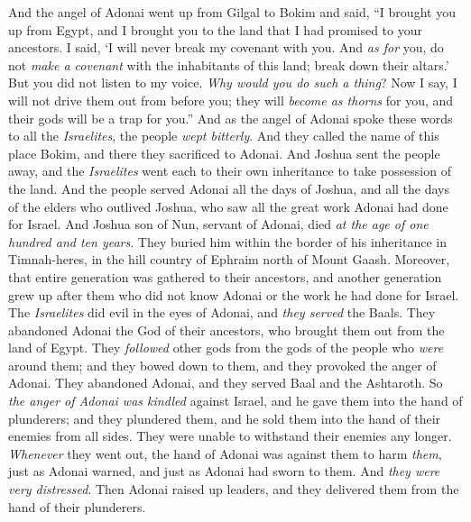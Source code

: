 \begin{biblechapter} %
 And the angel of Adonai went up from Gilgal to Bokim and said, “I brought you up from Egypt, and I brought you to the land that I had promised to your ancestors. I said, ‘I will never break my covenant with you.
\verse And \textit{as for} you, do not \textit{make a covenant} with the inhabitants of this land; break down their altars.’ But you did not listen to my voice. \textit{Why would you do such a thing}?
\verse Now I say, I will not drive them out from before you; they will \textit{become as thorns} for you, and their gods will be a trap for you.”
\verse And as the angel of Adonai spoke these words to all the \textit{Israelites}, the people \textit{wept bitterly}.
\verse And they called the name of this place Bokim, and there they sacrificed to Adonai.
 And Joshua sent the people away, and the \textit{Israelites} went each to their own inheritance to take possession of the land.
\verse And the people served Adonai all the days of Joshua, and all the days of the elders who outlived Joshua, who saw all the great work Adonai had done for Israel.
\verse And Joshua son of Nun, servant of Adonai, died \textit{at the age of one hundred and ten years}.
\verse They buried him within the border of his inheritance in Timnah-heres, in the hill country of Ephraim north of Mount Gaash.
\verse Moreover, that entire generation was gathered to their ancestors, and another generation grew up after them who did not know Adonai or the work he had done for Israel.
 The \textit{Israelites} did evil in the eyes of Adonai, and \textit{they served} the Baals.
\verse They abandoned Adonai the God of their ancestors, who brought them out from the land of Egypt. They \textit{followed} other gods from the gods of the people who \textit{were} around them; and they bowed down to them, and they provoked the anger of Adonai.
\verse They abandoned Adonai, and they served Baal and the Ashtaroth.
\verse So \textit{the anger of Adonai was kindled} against Israel, and he gave them into the hand of plunderers; and they plundered them, and he sold them into the hand of their enemies from all sides. They were unable to withstand their enemies any longer.
\verse \textit{Whenever} they went out, the hand of Adonai was against them to harm \textit{them}, just as Adonai warned, and just as Adonai had sworn to them. And \textit{they were very distressed}.
\verse Then Adonai raised up leaders, and they delivered them from the hand of their plunderers.

\end{biblechapter}
